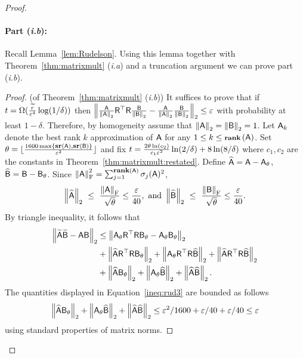 \begin{proof}
\paragraph{Part (\textit{i.b}):}
Recall Lemma~\ref{lem:Rudelson}. Using this lemma together with Theorem~\ref{thm:matrixmult} (\textit{i.a}) and a truncation argument we can prove part (\textit{i.b}).
\begin{proof}(of Theorem~\ref{thm:matrixmult} (\textit{i.b}))
It suffices to prove that if $t = \Omega(\frac{\widetilde{r}}{\varepsilon^4}\log(1/\delta))$ then $\left\|\frac{{\mathsf{A} }}{\left\|{\mathsf{A} }\right\|_2} {\mathsf{R} }^\top {\ensuremath{\mathsf{R} }} \frac{{\mathsf{B} }}{\left\|{\mathsf{B} }\right\|_2} - \frac{{\mathsf{A} }}{\left\|{\mathsf{A} }\right\|_2} \frac{{\mathsf{B} }}{\left\|{\mathsf{B} }\right\|_2}\right\|_2 \leq \varepsilon$ with probability at least $1-\delta$. Therefore, by homogeneity assume that $\left\|{\mathsf{A} }\right\|_2=\left\|{\mathsf{B} }\right\|_2=1$. Let ${\mathsf{A} }_k$ denote the best rank $k$ approximation of ${\mathsf{A} }$ for any $1\leq k \leq \operatorname{\textbf{{\footnotesize rank}}}\left({\mathsf{A} }\right)$. Set $\theta =\lfloor  \frac{1600 \max\{ \operatorname{\textbf{\footnotesize sr}}\left({\mathsf{A} }\right), \operatorname{\textbf{\footnotesize sr}}\left({\mathsf{B} }\right) \}}{\varepsilon^2}\rfloor$ and fix $t= \frac{2\theta \ln(c_2)}{c_1 \varepsilon^2} \ln(2/\delta) +  8 \ln(8/\delta)$  where $c_1,c_2$ are the constants in Theorem~\ref{thm:matrixmult:restated}. Define $\widehat{{\mathsf{A} }} = {\mathsf{A} } - {\mathsf{A} }_\theta$, $\widehat{{\mathsf{B} }} = {\mathsf{B} }- {\mathsf{B} }_\theta$. Since $\left\|{\mathsf{A} }\right\|_{\textrm{F}}^2 = \sum_{j=1}^{\operatorname{\textbf{{\footnotesize rank}}}\left({\mathsf{A} }\right)} \sigma_j({\mathsf{A} })^2$,
\begin{align*}
 	\left\|\widehat{{\mathsf{A} }}\right\|_2 \ \leq\ \dfrac{\left\|{\mathsf{A} }\right\|_{\textrm{F}} }{\sqrt{\theta}} \leq \dfrac{\varepsilon}{40}, \mbox{ and } \left\|\widehat{{\mathsf{B} }}\right\|_2	\ \leq \ \dfrac{\left\|{\mathsf{B} }\right\|_{\textrm{F}} }{\sqrt{\theta}} \leq \dfrac{\varepsilon}{40}.
\end{align*}
By triangle inequality, it follows that
\begin{align}
 	\left\| \widetilde{{\mathsf{A} }} \widetilde{{\mathsf{B} }} - {\mathsf{A} } {\mathsf{B} }\right\|_2  &\leq  \left\| {\mathsf{A} }_\theta {\ensuremath{\mathsf{R} }}^\top  {\ensuremath{\mathsf{R} }} {\ensuremath{\mathsf{B} }}_\theta - {\mathsf{A} }_\theta {\ensuremath{\mathsf{B} }}_\theta\right\|_2\label{ineq:rud1} \\
							& +  \left\| \widehat{{\mathsf{A} }} {\mathsf{R} }^\top {\ensuremath{\mathsf{R} }} {\ensuremath{\mathsf{B} }}_\theta\right\|_2   +   \left\| {\mathsf{A} }_\theta {\ensuremath{\mathsf{R} }}^\top  {\ensuremath{\mathsf{R} }} \widehat{{\mathsf{B} }} \right\|_2 + \left\| \widehat{{\mathsf{A} }} {\mathsf{R} }^\top {\ensuremath{\mathsf{R} }} \widehat{{\mathsf{B} }}\right\|_2 \label{ineq:rud2}\\
						    &   +   \left\| \widehat{{\mathsf{A} }} {\mathsf{B} }_\theta\right\|_2 + \left\| {\mathsf{A} }_\theta \widehat{{\mathsf{B} }} \right\|_2 + \left\| \widehat{{\mathsf{A} }} \widehat{{\mathsf{B} }} \right\|_2\label{ineq:rud3}.
\end{align}
The quantities displayed in Equation~\eqref{ineq:rud3} are bounded as follows
\begin{equation}\label{mm:rud0}
 \left\| \widehat{{\mathsf{A} }} {\mathsf{B} }_\theta\right\|_2 + \left\| {\mathsf{A} }_\theta \widehat{{\mathsf{B} }} \right\|_2 + \left\| \widehat{{\mathsf{A} }} \widehat{{\mathsf{B} }} \right\|_2 \leq \varepsilon^2/1600 + \varepsilon /40 +\varepsilon /40 \leq \varepsilon
\end{equation}
using standard properties of matrix norms.
%


\end{proof}
\end{proof}
